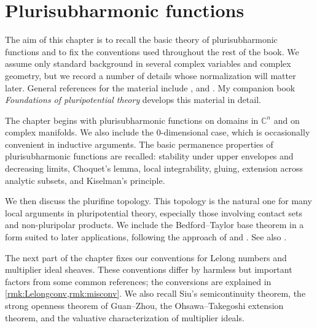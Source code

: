 \chapter{Plurisubharmonic functions}
\label{chap:pshfunctions}

The aim of this chapter is to recall the basic theory of plurisubharmonic functions and to fix the conventions used throughout the rest of the book. We assume only standard background in several complex variables and complex geometry, but we record a number of details whose normalization will matter later. General references for the material include \cite{GZ17}, \cite{Dem12} and \cite{DemBook}. My companion book \emph{Foundations of pluripotential theory} \cite[Chapters~7--8, 10--14]{FPT} develops this material in detail.

The chapter begins with plurisubharmonic functions on domains in $\mathbb C^n$ and on complex manifolds. We also include the $0$-dimensional case, which is occasionally convenient in inductive arguments. The basic permanence properties of plurisubharmonic functions are recalled: stability under upper envelopes and decreasing limits, Choquet's lemma, local integrability, gluing, extension across analytic subsets, and Kiselman's principle.

We then discuss the plurifine topology. This topology is the natural one for many local arguments in pluripotential theory, especially those involving contact sets and non-pluripolar products. We include the Bedford--Taylor base theorem in a form suited to later applications, following the approach of \cite{BT87} and \cite{EMW06}. See also \cite[Proposition~10.3.2]{FPT}.

The next part of the chapter fixes our conventions for Lelong numbers and multiplier ideal sheaves. These conventions differ by harmless but important factors from some common references; the conversions are explained in \cref{rmk:Lelongconv,rmk:misconv}. We also recall Siu's semicontinuity theorem, the strong openness theorem of Guan--Zhou, the Ohsawa--Takegoshi extension theorem, and the valuative characterization of multiplier ideals.

